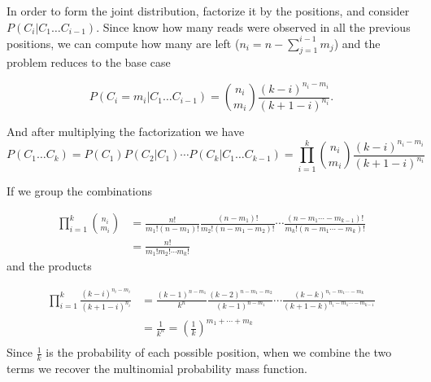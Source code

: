 In order to form the joint distribution,
factorize it by the positions,
and consider $P(C_{i}| C_{1}\ldots C_{i-1})$.
Since know how many reads were observed in all the previous positions,
we can compute how many are left ($n_{i} = n - \sum_{j=1}^{i-1} m_{j}$)
and the problem reduces to the base case

\begin{equation}
  P(C_{i} = m_i | C_{1}\ldots C_{i-1}) = {n_i \choose m_i} \frac{(k-i)^{n_i-m_i}}{(k+1-i)^{n_i}}. \nonumber
\end{equation}

And after multiplying the factorization we have
\begin{equation}
  P(C_{1} \ldots C_{k}) = P(C_{1}) P(C_{2} | C_{1}) \cdots P(C_{k}|C_{1}\ldots C_{k-1}) = \prod_{i=1}^{k} {n_{i}\choose m_{i}} \frac{(k-i)^{n_{i}-m_{i}}}{(k+1-i)^{n_i}} \nonumber
\end{equation}

If we group the combinations

\begin{align}
  \prod_{i=1}^{k} {n_{i}\choose m_{i}} &=
  \frac{n!}{m_{1}!(n-m_{1})!} \frac{(n-m_{1})!}{m_{2}!(n-m_{1}-m_{2})!} \cdots
      \frac{(n-m_{1}\cdots - m_{k-1})!}{m_{k}!(n-m_{1}\cdots - m_{k})!} 
  \nonumber \\
  &= \frac{n!}{m_{1}!m_{2}!\cdots m_{k}!} \nonumber
\end{align}
and the products

\begin{align}
  \prod_{i=1}^{k} \frac{(k-i)^{n_{i}-m_{i}}}{(k+1-i)^{n_i}} &=
    \frac{(k-1)^{n-m_{1}}}{k^{n}}\frac{(k-2)^{n-m_{1}-m_{2}}}{(k-1)^{n-m_{1}}} \cdots
    \frac{(k-k)^{n_{i}-m_{1}\cdots-m_{k}}}{(k+1-k)^{n_{i}-m_{1}\cdots-m_{k-1}}} \nonumber \\ 
  &= \frac{1}{k^{n}} = \left(\frac{1}{k}\right)^{m_{1}+\cdots+m_{k}} \nonumber \\
\end{align}
Since $\frac{1}{k}$ is the probability of each possible position,
when we combine the two terms we recover the multinomial
probability mass function.

\begin{comment}
\end{comment}

